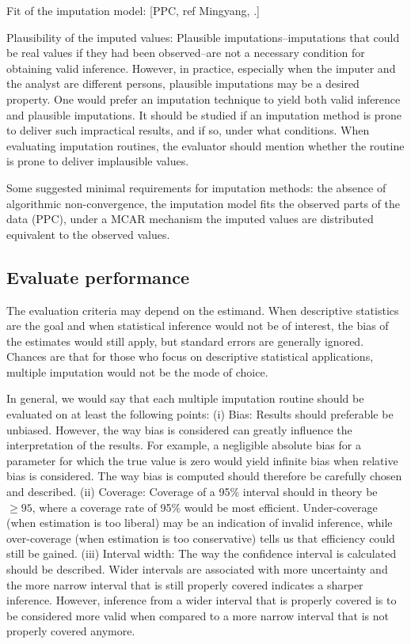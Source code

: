 \documentclass[bimj,fleqn]{w-art}
\begin{document}
Fit of the imputation model: [PPC, ref Mingyang, \citep{nguy17, zhao22}.]

Plausibility of the imputed values: Plausible imputations--imputations that could be real values if they had been observed--are not a necessary condition for obtaining valid inference. However, in practice, especially when the imputer and the analyst are different persons, plausible imputations may be a desired property. One would prefer an imputation technique to yield both valid inference and plausible imputations. It should be studied if an imputation method is prone to deliver such impractical results, and if so, under what conditions. When evaluating imputation routines, the evaluator should mention whether the routine is prone to deliver implausible values. 

Some suggested minimal requirements for imputation methods: the absence of algorithmic non-convergence, the imputation model fits the observed parts of the data (PPC), under a MCAR mechanism the imputed values are distributed equivalent to the observed values.



\subsection{Evaluate performance}


The evaluation criteria may depend on the estimand. When descriptive statistics are the goal and when statistical inference would not be of interest, the bias of the estimates would still apply, but standard errors are generally ignored. Chances are that for those who focus on descriptive statistical applications, multiple imputation would not be the mode of choice. 

In general, we would say that each multiple imputation routine should be evaluated on at least the following points:
 (i) Bias: Results should preferable be unbiased. However, the way bias is considered can greatly influence the interpretation of the results. For example, a negligible absolute bias for a parameter for which the true value is zero would yield infinite bias when relative bias is considered. The way bias is computed should therefore be carefully chosen and described. 
(ii) Coverage: Coverage of a 95\% interval should in theory be $\geq 95$, where a coverage rate of 95\% would be most efficient. Under-coverage (when estimation is too liberal) may be an indication of invalid inference, while over-coverage (when estimation is too conservative) tells us that efficiency could still be gained. 
(iii) Interval width: The way the confidence interval is calculated should be described. Wider intervals are associated with more uncertainty and the more narrow interval that is still properly covered indicates a sharper inference. However, inference from a wider interval that is properly covered is to be considered more valid when compared to a more narrow interval that is not properly covered anymore. 
\end{document}
